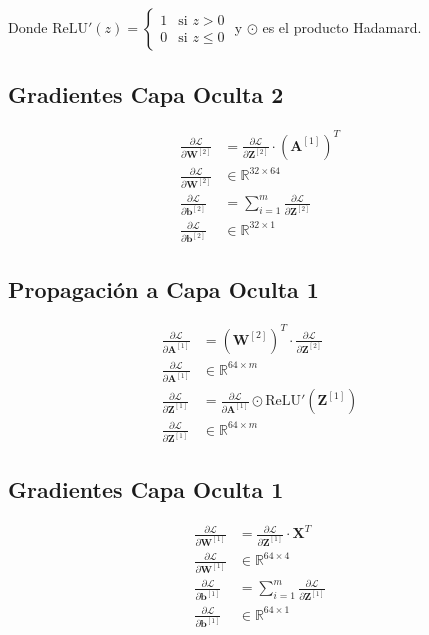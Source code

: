 \documentclass[12pt]{article}
\begin{document}
Donde $\text{ReLU}'(z) = \begin{cases} 1 & \text{si } z > 0 \\ 0 & \text{si } z \leq 0 \end{cases}$ y $\odot$ es el producto Hadamard.

\subsection{Gradientes Capa Oculta 2}

\begin{align}
\frac{\partial \mathcal{L}}{\partial \mathbf{W}^{[2]}} &= \frac{\partial \mathcal{L}}{\partial \mathbf{Z}^{[2]}} \cdot (\mathbf{A}^{[1]})^T \\
\frac{\partial \mathcal{L}}{\partial \mathbf{W}^{[2]}} &\in \mathbb{R}^{32 \times 64} \\
\frac{\partial \mathcal{L}}{\partial \mathbf{b}^{[2]}} &= \sum_{i=1}^m \frac{\partial \mathcal{L}}{\partial \mathbf{Z}^{[2]}} \\
\frac{\partial \mathcal{L}}{\partial \mathbf{b}^{[2]}} &\in \mathbb{R}^{32 \times 1}
\end{align}

\subsection{Propagación a Capa Oculta 1}

\begin{align}
\frac{\partial \mathcal{L}}{\partial \mathbf{A}^{[1]}} &= (\mathbf{W}^{[2]})^T \cdot \frac{\partial \mathcal{L}}{\partial \mathbf{Z}^{[2]}} \\
\frac{\partial \mathcal{L}}{\partial \mathbf{A}^{[1]}} &\in \mathbb{R}^{64 \times m} \\
\frac{\partial \mathcal{L}}{\partial \mathbf{Z}^{[1]}} &= \frac{\partial \mathcal{L}}{\partial \mathbf{A}^{[1]}} \odot \text{ReLU}'(\mathbf{Z}^{[1]}) \\
\frac{\partial \mathcal{L}}{\partial \mathbf{Z}^{[1]}} &\in \mathbb{R}^{64 \times m}
\end{align}

\subsection{Gradientes Capa Oculta 1}

\begin{align}
\frac{\partial \mathcal{L}}{\partial \mathbf{W}^{[1]}} &= \frac{\partial \mathcal{L}}{\partial \mathbf{Z}^{[1]}} \cdot \mathbf{X}^T \\
\frac{\partial \mathcal{L}}{\partial \mathbf{W}^{[1]}} &\in \mathbb{R}^{64 \times 4} \\
\frac{\partial \mathcal{L}}{\partial \mathbf{b}^{[1]}} &= \sum_{i=1}^m \frac{\partial \mathcal{L}}{\partial \mathbf{Z}^{[1]}} \\
\frac{\partial \mathcal{L}}{\partial \mathbf{b}^{[1]}} &\in \mathbb{R}^{64 \times 1}
\end{align}
\end{document}
